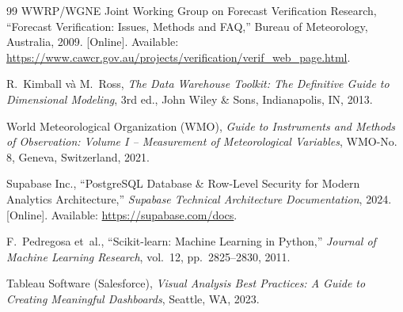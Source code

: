 \documentclass[12pt, a4paper]{report}
\begin{document}
\begin{thebibliography}{99}
WWRP/WGNE Joint Working Group on Forecast Verification Research,
\newblock ``Forecast Verification: Issues, Methods and FAQ,''
\newblock Bureau of Meteorology, Australia, 2009. [Online]. Available: \url{https://www.cawcr.gov.au/projects/verification/verif_web_page.html}.

R.~Kimball và M.~Ross,
\newblock \textit{The Data Warehouse Toolkit: The Definitive Guide to Dimensional Modeling}, 3rd ed.,
\newblock John Wiley \& Sons, Indianapolis, IN, 2013.

World Meteorological Organization (WMO),
\newblock \textit{Guide to Instruments and Methods of Observation: Volume I -- Measurement of Meteorological Variables},
\newblock WMO-No. 8, Geneva, Switzerland, 2021.

Supabase Inc.,
\newblock ``PostgreSQL Database \& Row-Level Security for Modern Analytics Architecture,''
\newblock \textit{Supabase Technical Architecture Documentation}, 2024. [Online]. Available: \url{https://supabase.com/docs}.

F.~Pedregosa et~al.,
\newblock ``Scikit-learn: Machine Learning in Python,''
\newblock \textit{Journal of Machine Learning Research}, vol.~12, pp.~2825--2830, 2011.

Tableau Software (Salesforce),
\newblock \textit{Visual Analysis Best Practices: A Guide to Creating Meaningful Dashboards},
\newblock Seattle, WA, 2023.

\end{thebibliography}
\end{document}

